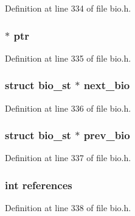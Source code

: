 Definition at line 334 of file bio.\+h.

\subsubsection[{\texorpdfstring{ptr}{ptr}}]{ $\ast$ ptr}\hypertarget{structbio__st_aaf0497a3bd20a0066017546af6bf80be}{}\label{structbio__st_aaf0497a3bd20a0066017546af6bf80be}


Definition at line 335 of file bio.\+h.

\subsubsection[{\texorpdfstring{next\+\_\+bio}{next_bio}}]{\setlength{\rightskip}{0pt plus 5cm}struct {\bf bio\+\_\+st} $\ast$ next\+\_\+bio}\hypertarget{structbio__st_a4fbf53707f4e99358b07b8eccc9e1824}{}\label{structbio__st_a4fbf53707f4e99358b07b8eccc9e1824}


Definition at line 336 of file bio.\+h.

\subsubsection[{\texorpdfstring{prev\+\_\+bio}{prev_bio}}]{\setlength{\rightskip}{0pt plus 5cm}struct {\bf bio\+\_\+st} $\ast$ prev\+\_\+bio}\hypertarget{structbio__st_ad3a3d13528e34c879a80347cf904e0ce}{}\label{structbio__st_ad3a3d13528e34c879a80347cf904e0ce}


Definition at line 337 of file bio.\+h.

\subsubsection[{\texorpdfstring{references}{references}}]{\setlength{\rightskip}{0pt plus 5cm}int references}\hypertarget{structbio__st_a146fdb34d9a909e530adf8b189481195}{}\label{structbio__st_a146fdb34d9a909e530adf8b189481195}


Definition at line 338 of file bio.\+h.

